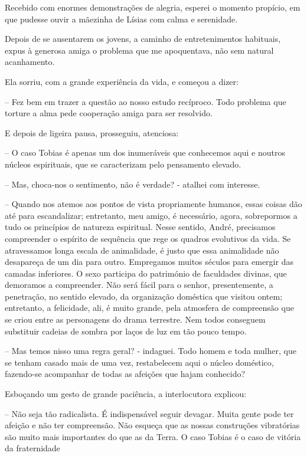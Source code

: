 \documentclass[portuguese,12pt,a4paper]{scrbook}
\begin{document}
	Recebido com enormes demonstrações de alegria, esperei o momento propício, em que pudesse ouvir a mãezinha de Lísias com calma e serenidade.
	
	Depois de se ausentarem os jovens, a caminho de entretenimentos habituais, expus à generosa amiga o problema que me apoquentava, não sem natural acanhamento.
	
	Ela sorriu, com a grande experiência da vida, e começou a dizer:
	
	– Fez bem em trazer a questão ao nosso estudo recíproco. Todo problema que torture a alma pede cooperação amiga para ser resolvido.
	
	
	E depois de ligeira pausa, prosseguiu, atenciosa:
	
	– O caso Tobias é apenas um dos inumeráveis que conhecemos aqui e noutros núcleos espirituais, que se caracterizam pelo pensamento elevado.
	
	– Mas, choca-nos o sentimento, não é verdade? - atalhei com interesse.
	
	– Quando nos atemos aos pontos de vista propriamente humanos, essas coisas dão até para escandalizar; entretanto, meu amigo, é necessário, agora, sobrepormos a tudo os princípios de natureza espiritual. Nesse sentido, André, precisamos compreender o espírito de sequência que rege os quadros evolutivos da vida. Se atravessamos longa escala de animalidade, é justo que essa animalidade não desapareça de um dia para outro. Empregamos muitos séculos para emergir das camadas inferiores. O sexo participa do património de faculdades divinas, que demoramos a compreender. Não será fácil para o senhor, presentemente, a penetração, no sentido elevado, da organização doméstica que visitou ontem; entretanto, a felicidade, ali, é muito grande, pela atmosfera de compreensão que se criou entre as personagens do drama terrestre. Nem todos conseguem substituir cadeias de sombra por laços de luz em tão pouco tempo.
	
	– Mas temos nisso uma regra geral? - indaguei. Todo homem e toda mulher, que se tenham casado mais de uma vez, restabelecem aqui o núcleo doméstico, fazendo-se acompanhar de todas as afeições que hajam conhecido?
	
	Esboçando um gesto de grande paciência, a interlocutora explicou:
	
	– Não seja tão radicalista. É indispensável seguir devagar. Muita gente pode ter afeição e não ter compreensão. Não esqueça que as nossas construções vibratórias são muito mais importantes do que as da Terra. O caso Tobias é o caso de vitória da fraternidade
	
\end{document}
